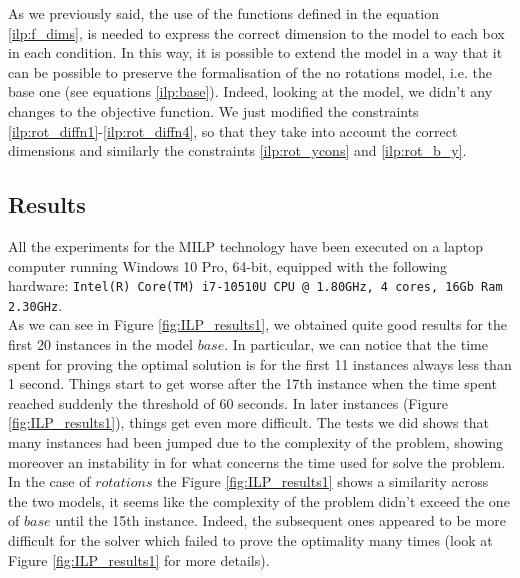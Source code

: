     As we previously said, the use of the functions defined in the equation \ref{ilp:f_dims}, is 
    needed to express the correct dimension to the model to each box in each condition. In this way,
    it is possible to extend the model in a way that it can be possible to preserve the 
    formalisation of the no rotations model, i.e. the base one (see equations \ref{ilp:base}).
    Indeed, looking at the model, we didn't any changes to the objective function. We just modified
    the constraints \ref{ilp:rot_diffn1}-\ref{ilp:rot_diffn4}, so that they take into account the 
    correct dimensions and similarly the constraints \ref{ilp:rot_ycons} and \ref{ilp:rot_b_y}.


\subsection{Results}
    All the experiments for the MILP technology have been executed on a laptop computer running 
    Windows 10 Pro, 64-bit, equipped with the following hardware:
    \texttt{Intel(R) Core(TM) i7-10510U CPU @ 1.80GHz, 4 cores, 16Gb Ram 2.30GHz}.\\

    As we can see in Figure \ref{fig:ILP_results1}, we obtained quite good results for the 
    first 20 instances in the model \(base\). In particular, we can notice that the time spent for
    proving the optimal solution is for the first 11 instances always less than 1 second. Things 
    start to get worse after the 17th instance when the time spent reached suddenly the
    threshold of 60 seconds. In later instances (Figure \ref{fig:ILP_results1}), things get even 
    more difficult. The tests we did shows that many instances had been jumped due to the 
    complexity of the problem, showing moreover an instability in for what concerns the time used 
    for solve the problem. \\
    
    In the case of \(rotations\) the Figure \ref{fig:ILP_results1} shows a similarity across the
    two models, it seems like the complexity of the problem didn't exceed the one of \(base\)
    until the 15th instance. Indeed, the subsequent ones appeared to be more difficult for the
    solver which failed to prove the optimality many times (look at Figure \ref{fig:ILP_results1} 
    for more details). \\ 


